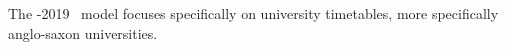 


The \ITC{}-2019~\cite{2018_muller_PATAT,2019_lindahl_EJOR,2019_jawa_JIM} model focuses specifically on university timetables, more specifically anglo-saxon universities. %
